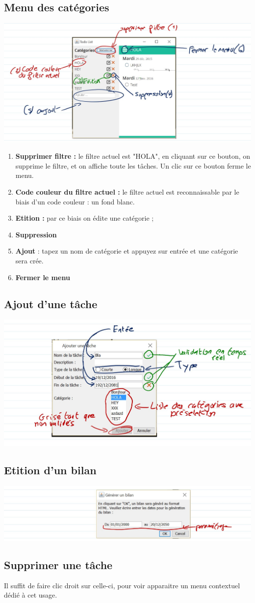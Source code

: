 \documentclass{article}
\begin{document}
	\subsection{Menu des catégories}
		\includegraphics[width=14cm]{images/menu.jpg}
		\begin{enumerate}
			\item \textbf{Supprimer filtre : }le filtre actuel est "HOLA", en cliquant sur ce bouton, on supprime le filtre, et on affiche toute les tâches. Un clic sur ce bouton ferme le menu.
			\item \textbf{Code couleur du filtre actuel : }le filtre actuel est reconnaissable par le biais d'un code couleur : un fond blanc.
			\item \textbf{Etition : }par ce biais on édite une catégorie ;
			\item \textbf{Suppression}
			\item \textbf{Ajout} : tapez un nom de catégorie et appuyez sur entrée et une catégorie sera crée.
			\item \textbf{Fermer le menu} 
		\end{enumerate}
	\subsection{Ajout d'une tâche}
		\includegraphics[width=14cm]{images/add.jpg}
	\subsection{Etition d'un bilan}
		\includegraphics[width=14cm]{images/bilan.jpg}
	\subsection{Supprimer une tâche}
		Il suffit de faire clic droit sur celle-ci, pour voir apparaitre un menu contextuel dédié à cet usage.
\end{document}
